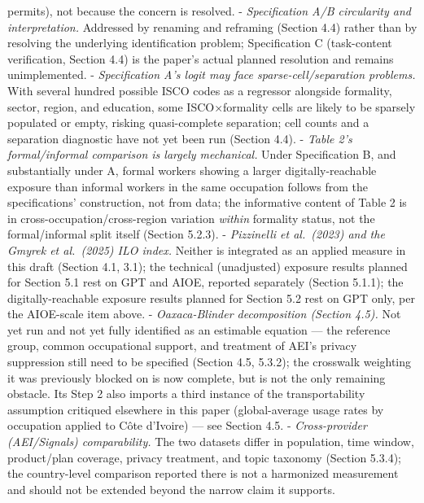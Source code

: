 \documentclass[
  11pt,
]{article}
\begin{document}
permits), not because the concern is resolved. - \emph{Specification A/B
circularity and interpretation.} Addressed by renaming and reframing
(Section 4.4) rather than by resolving the underlying identification
problem; Specification C (task-content verification, Section 4.4) is the
paper's actual planned resolution and remains unimplemented. -
\emph{Specification A's logit may face sparse-cell/separation problems.}
With several hundred possible ISCO codes as a regressor alongside
formality, sector, region, and education, some ISCO×formality cells are
likely to be sparsely populated or empty, risking quasi-complete
separation; cell counts and a separation diagnostic have not yet been
run (Section 4.4). - \emph{Table 2's formal/informal comparison is
largely mechanical.} Under Specification B, and substantially under A,
formal workers showing a larger digitally-reachable exposure than
informal workers in the same occupation follows from the specifications'
construction, not from data; the informative content of Table 2 is in
cross-occupation/cross-region variation \emph{within} formality status,
not the formal/informal split itself (Section 5.2.3). - \emph{Pizzinelli
et al.~(2023) and the Gmyrek et al.~(2025) ILO index.} Neither is
integrated as an applied measure in this draft (Section 4.1, 3.1); the
technical (unadjusted) exposure results planned for Section 5.1 rest on
GPT and AIOE, reported separately (Section 5.1.1); the
digitally-reachable exposure results planned for Section 5.2 rest on GPT
only, per the AIOE-scale item above. - \emph{Oaxaca-Blinder
decomposition (Section 4.5).} Not yet run and not yet fully identified
as an estimable equation --- the reference group, common occupational
support, and treatment of AEI's privacy suppression still need to be
specified (Section 4.5, 5.3.2); the crosswalk weighting it was
previously blocked on is now complete, but is not the only remaining
obstacle. Its Step 2 also imports a third instance of the
transportability assumption critiqued elsewhere in this paper
(global-average usage rates by occupation applied to Côte d'Ivoire) ---
see Section 4.5. - \emph{Cross-provider (AEI/Signals) comparability.}
The two datasets differ in population, time window, product/plan
coverage, privacy treatment, and topic taxonomy (Section 5.3.4); the
country-level comparison reported there is not a harmonized measurement
and should not be extended beyond the narrow claim it supports.
\end{document}
